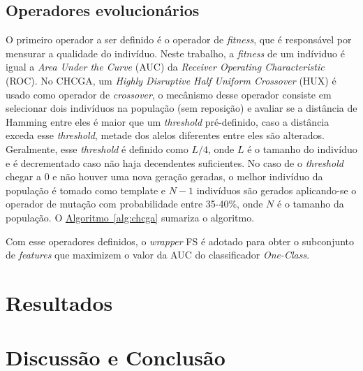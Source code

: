 \documentclass{article}
\begin{document}
\subsection{Operadores evolucionários}
O primeiro operador a ser definido é o operador de \textit{fitness}, que é
responsável por mensurar a qualidade do indivíduo. Neste trabalho, a
\textit{fitness} de um indíviduo é igual a \textit{Area Under the Curve} (AUC)
da \textit{Receiver Operating Characteristic} (ROC). No CHCGA, um \textit{Highly
  Disruptive Half Uniform Crossover} (HUX) é usado como operador de
\textit{crossover}, o mecânismo desse operador consiste em selecionar dois
indivíduos na população (sem reposição) e avaliar se a distância de Hamming
entre eles é maior que um \textit{threshold} pré-definido, caso a distância
exceda esse \textit{threshold}, metade dos alelos diferentes entre eles são
alterados. Geralmente, esse \textit{threshold} é definido como $L/4$, onde $L$ é
o tamanho do indivíduo e é decrementado caso não haja decendentes suficientes.
No caso de o \textit{threshold} chegar a 0 e não houver uma nova geração
geradas, o melhor indivíduo da população é tomado como template e $N-1$
indivíduos são gerados aplicando-se o operador de mutação com probabilidade
entre 35-40\%, onde $N$ é o tamanho da população. O
\hyperref[alg:chcga]{Algoritmo~\ref*{alg:chcga}} sumariza o algoritmo.

Com esse operadores definidos, o \textit{wrapper} FS é adotado para obter o
subconjunto de \textit{features} que maximizem o valor da AUC do classificador
\textit{One-Class}.

\section{Resultados} \label{sec_resultados}

\section{Discussão e Conclusão} \label{sec_conclusao}



\end{document}

